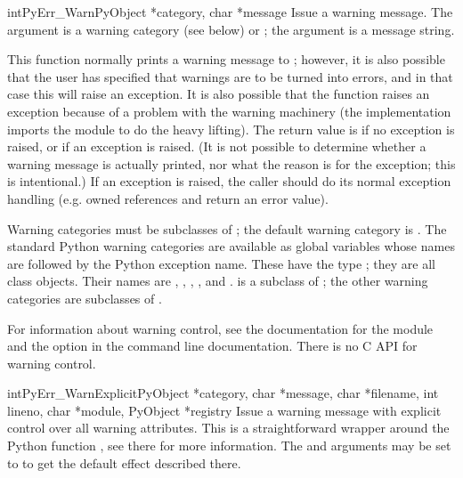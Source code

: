 \documentclass{manual}
\begin{document}
\begin{cfuncdesc}{int}{PyErr_Warn}{PyObject *category, char *message}
Issue a warning message.  The  argument is a warning
category (see below) or \NULL; the  argument is a message
string.

This function normally prints a warning message to ;
however, it is also possible that the user has specified that warnings
are to be turned into errors, and in that case this will raise an
exception.  It is also possible that the function raises an exception
because of a problem with the warning machinery (the implementation
imports the  module to do the heavy lifting).  The
return value is  if no exception is raised, or  if
an exception is raised.  (It is not possible to determine whether a
warning message is actually printed, nor what the reason is for the
exception; this is intentional.)  If an exception is raised, the
caller should do its normal exception handling
(e.g.  owned references and return an error
value).

Warning categories must be subclasses of ; the default
warning category is .  The standard Python
warning categories are available as global variables whose names are
 followed by the Python exception name.  These have the
type ; they are all class objects.  Their names are
, ,
, , and
.   is a subclass of
; the other warning categories are subclasses
of .

For information about warning control, see the documentation for the
 module and the  option in the command
line documentation.  There is no C API for warning control.
\end{cfuncdesc}

\begin{cfuncdesc}{int}{PyErr_WarnExplicit}{PyObject *category, char *message,
char *filename, int lineno, char *module, PyObject *registry}
Issue a warning message with explicit control over all warning
attributes.  This is a straightforward wrapper around the Python
function , see there for more
information.  The  and  arguments may be
set to  to get the default effect described there.
\end{cfuncdesc}
\end{document}
